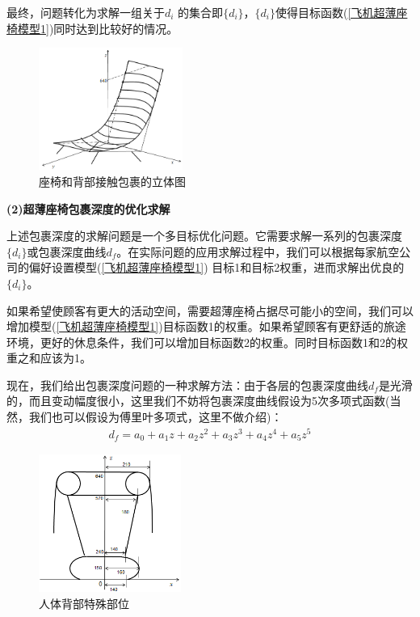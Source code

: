             \par
            最终，问题转化为求解一组关于$d_i$ 的集合即$\{d_i \}$，$\{d_i \}$使得目标函数(\ref{飞机超薄座椅模型1})同时达到比较好的情况。
            \begin{figure}[H]
            \centering
            \includegraphics[height=4cm]{images/seat_and_back_near_parcel.jpg}
            \caption{座椅和背部接触包裹的立体图}
            \label{座椅和背部接触包裹的立体图}
            \end{figure}
            \par
            \textbf{(2)超薄座椅包裹深度的优化求解}
            \par
            上述包裹深度的求解问题是一个多目标优化问题。它需要求解一系列的包裹深度$\{d_i \}$或包裹深度曲线$d_f$。在实际问题的应用求解过程中，我们可以根据每家航空公司的偏好设置模型(\ref{飞机超薄座椅模型1})
            目标1和目标2权重，进而求解出优良的$\{d_i \}$。
            \par
            如果希望使顾客有更大的活动空间，需要超薄座椅占据尽可能小的空间，我们可以增加模型(\ref{飞机超薄座椅模型1})目标函数1的权重。如果希望顾客有更舒适的旅途环境，更好的休息条件，我们可以增加目标函数2的权重。同时目标函数1和2的权重之和应该为1。
            \par
            现在，我们给出包裹深度问题的一种求解方法：由于各层的包裹深度曲线$d_f$是光滑的，而且变动幅度很小，这里我们不妨将包裹深度曲线假设为5次多项式函数(当然，我们也可以假设为傅里叶多项式，这里不做介绍)：
            \begin{align*}
            d_f = a_0+a_1z+a_2z^2+a_3z^3+a_4z^4+a_5z^5
            \end{align*}
            \begin{figure}[H]
            \centering
            \includegraphics[height=4.5cm]{images/body_back_special_segment.jpg}
            \caption{人体背部特殊部位}
            \label{人体背部特殊部位}
            \end{figure}
